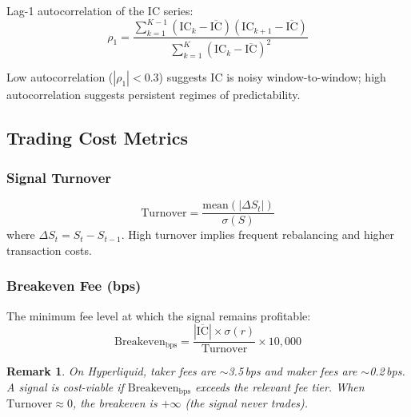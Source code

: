 \documentclass[11pt,a4paper]{article}
\newtheorem{remark}{Remark}
\begin{document}
Lag-1 autocorrelation of the IC series:
\begin{equation}
    \rho_1 = \frac{\sum_{k=1}^{K-1}
        (\mathrm{IC}_k - \overline{\mathrm{IC}})
        (\mathrm{IC}_{k+1} - \overline{\mathrm{IC}})}
        {\sum_{k=1}^{K} (\mathrm{IC}_k - \overline{\mathrm{IC}})^2}
    \label{eq:ic_autocorr}
\end{equation}

Low autocorrelation ($|\rho_1| < 0.3$) suggests IC is noisy window-to-window;
high autocorrelation suggests persistent regimes of predictability.

\subsection{Trading Cost Metrics}

\subsubsection{Signal Turnover}

\begin{equation}
    \mathrm{Turnover} = \frac{\mathrm{mean}(|\Delta S_t|)}{\sigma(S)}
    \label{eq:turnover}
\end{equation}
where $\Delta S_t = S_t - S_{t-1}$. High turnover implies frequent
rebalancing and higher transaction costs.

\subsubsection{Breakeven Fee (bps)}

The minimum fee level at which the signal remains profitable:
\begin{equation}
    \mathrm{Breakeven}_{\mathrm{bps}} =
        \frac{|\overline{\mathrm{IC}}| \times \sigma(r)}
             {\mathrm{Turnover}} \times 10{,}000
    \label{eq:breakeven}
\end{equation}

\begin{remark}
On Hyperliquid, taker fees are $\sim$3.5\,bps and maker fees are
$\sim$0.2\,bps. A signal is cost-viable if $\mathrm{Breakeven}_{\mathrm{bps}}$
exceeds the relevant fee tier. When $\mathrm{Turnover} \approx 0$, the
breakeven is $+\infty$ (the signal never trades).
\end{remark}

\end{document}
